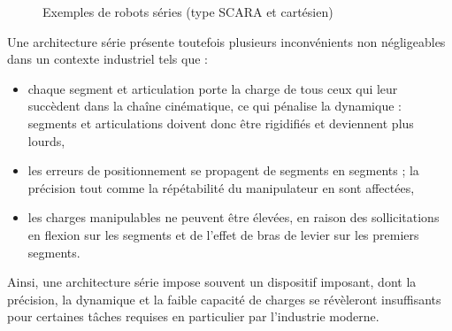 \begin{figure}[!ht]
  \centering
       \hfill
    \caption{\footnotesize{Exemples de robots séries (type SCARA et 
cart\'esien)}}
\label{intro:fig2}
\end{figure}

Une architecture série présente toutefois plusieurs inconvénients non négli\-gea\-bles dans un contexte industriel tels que :
\begin{itemize}
 \item chaque segment et articulation porte la charge de tous ceux qui leur succèdent dans la chaîne cinématique, ce qui pénalise la dynamique : segments et articulations doivent donc être rigidifiés et deviennent plus lourds, 
 \item les erreurs de positionnement se propagent de segments en segments ; la précision tout comme la répétabilité du manipulateur en sont affectées,
 \item les charges manipulables ne peuvent être \'elev\'ees, en raison des 
sollicitations en flexion sur les segments et de l'effet de bras de levier sur 
les premiers segments.
\end{itemize}

Ainsi, une architecture série impose souvent un dispositif imposant, dont la 
précision, la dynamique et la faible capacité de charges se révèleront 
insuffisants pour certaines tâches requises en particulier par l'industrie 
moderne.

